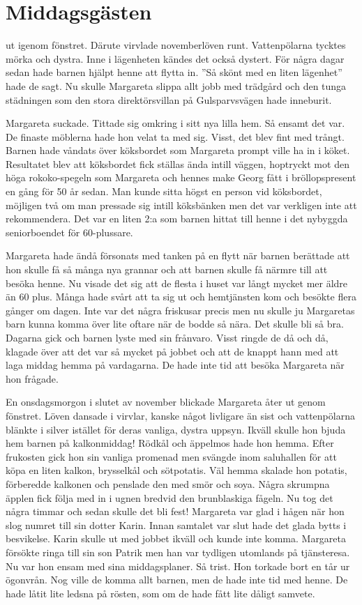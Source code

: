 \chapter[middagsgästen]{Middagsgästen}

 ut igenom fönstret. Därute virvlade novemberlöven runt. Vattenpölarna tycktes mörka och dystra. Inne i lägenheten kändes det också dystert. För några dagar sedan hade barnen hjälpt henne att flytta in. ”Så skönt med en liten lägenhet” hade de sagt. Nu skulle Margareta slippa allt jobb med trädgård och den tunga städningen som den stora direktörsvillan på Gulsparvsvägen hade inneburit.

Margareta suckade. Tittade sig omkring i sitt nya lilla hem. Så ensamt det var. De finaste möblerna hade hon velat ta med sig. Visst, det blev fint med trångt. Barnen hade våndats över köksbordet som Margareta prompt ville ha in i köket. Resultatet blev att köksbordet fick ställas ända intill väggen, hoptryckt mot den höga rokoko-spegeln som Margareta och hennes make Georg fått i bröllopspresent en gång för 50 år sedan. Man kunde sitta högst en person vid köksbordet, möjligen två om man pressade sig intill köksbänken men det var verkligen inte att rekommendera. Det var en liten 2:a som barnen hittat till henne i det nybyggda seniorboendet för 60-plussare. 

Margareta hade ändå försonats med tanken på en flytt när barnen berättade att hon skulle få så många nya grannar och att barnen skulle få närmre till att besöka henne. Nu visade det sig att de flesta i huset var långt mycket mer äldre än 60 plus. Många hade svårt att ta sig ut och hemtjänsten kom och besökte flera gånger om dagen. Inte var det några friskusar precis men nu skulle ju Margaretas barn kunna komma över lite oftare när de bodde så nära. Det skulle bli så bra. Dagarna gick och barnen lyste med sin frånvaro. Visst ringde de då och då, klagade över att det var så mycket på jobbet och att de knappt hann med att laga middag hemma på vardagarna. De hade inte tid att besöka Margareta när hon frågade.

En onsdagsmorgon i slutet av november blickade Margareta åter ut genom fönstret. Löven dansade i virvlar, kanske något livligare än sist och vattenpölarna blänkte i silver istället för deras vanliga, dystra uppsyn. Ikväll skulle hon bjuda hem barnen på kalkonmiddag! Rödkål och äppelmos hade hon hemma. Efter frukosten gick hon sin vanliga promenad men svängde inom saluhallen för att köpa en liten kalkon, brysselkål och sötpotatis. Väl hemma skalade hon potatis, förberedde kalkonen och penslade den med smör och soya. Några skrumpna äpplen fick följa med in i ugnen bredvid den brunblaskiga fågeln. Nu tog det några timmar och sedan skulle det bli fest! Margareta var glad i hågen när hon slog numret till sin dotter Karin. Innan samtalet var slut hade det glada bytts i besvikelse. Karin skulle ut med jobbet ikväll och kunde inte komma. Margareta försökte ringa till sin son Patrik men han var tydligen utomlands på tjänsteresa. Nu var hon ensam med sina middagsplaner. Så trist. Hon torkade bort en tår ur ögonvrån. Nog ville de komma allt barnen, men de hade inte tid med henne. De hade låtit lite ledsna på rösten, som om de hade fått lite dåligt samvete. 

